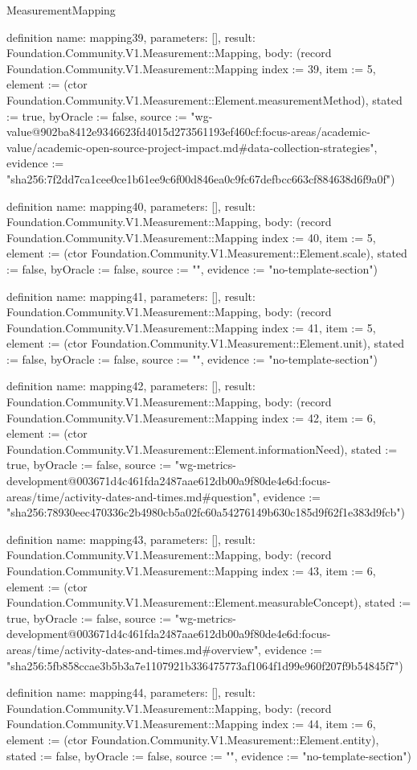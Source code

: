 \begin{lexlean}{MeasurementMapping}
\begin{semanticmodule}
definition{
  name: mapping39,
  parameters: [],
  result: Foundation.Community.V1.Measurement::Mapping,
  body: (record Foundation.Community.V1.Measurement::Mapping {index := 39, item := 5, element := (ctor Foundation.Community.V1.Measurement::Element.measurementMethod), stated := true, byOracle := false, source := "wg-value@902ba8412e9346623fd4015d273561193ef460cf:focus-areas/academic-value/academic-open-source-project-impact.md#data-collection-strategies", evidence := "sha256:7f2dd7ca1cee0ce1b61ee9c6f00d846ea0c9fc67defbcc663cf884638d6f9a0f"})
}

definition{
  name: mapping40,
  parameters: [],
  result: Foundation.Community.V1.Measurement::Mapping,
  body: (record Foundation.Community.V1.Measurement::Mapping {index := 40, item := 5, element := (ctor Foundation.Community.V1.Measurement::Element.scale), stated := false, byOracle := false, source := "", evidence := "no-template-section"})
}

definition{
  name: mapping41,
  parameters: [],
  result: Foundation.Community.V1.Measurement::Mapping,
  body: (record Foundation.Community.V1.Measurement::Mapping {index := 41, item := 5, element := (ctor Foundation.Community.V1.Measurement::Element.unit), stated := false, byOracle := false, source := "", evidence := "no-template-section"})
}

definition{
  name: mapping42,
  parameters: [],
  result: Foundation.Community.V1.Measurement::Mapping,
  body: (record Foundation.Community.V1.Measurement::Mapping {index := 42, item := 6, element := (ctor Foundation.Community.V1.Measurement::Element.informationNeed), stated := true, byOracle := false, source := "wg-metrics-development@003671d4c461fda2487aae612db00a9f80de4e6d:focus-areas/time/activity-dates-and-times.md#question", evidence := "sha256:78930eec470336c2b4980cb5a02fc60a54276149b630c185d9f62f1e383d9fcb"})
}

definition{
  name: mapping43,
  parameters: [],
  result: Foundation.Community.V1.Measurement::Mapping,
  body: (record Foundation.Community.V1.Measurement::Mapping {index := 43, item := 6, element := (ctor Foundation.Community.V1.Measurement::Element.measurableConcept), stated := true, byOracle := false, source := "wg-metrics-development@003671d4c461fda2487aae612db00a9f80de4e6d:focus-areas/time/activity-dates-and-times.md#overview", evidence := "sha256:5fb858ccae3b5b3a7e1107921b336475773af1064f1d99e960f207f9b54845f7"})
}

definition{
  name: mapping44,
  parameters: [],
  result: Foundation.Community.V1.Measurement::Mapping,
  body: (record Foundation.Community.V1.Measurement::Mapping {index := 44, item := 6, element := (ctor Foundation.Community.V1.Measurement::Element.entity), stated := false, byOracle := false, source := "", evidence := "no-template-section"})
}


\end{semanticmodule}
\end{lexlean}
